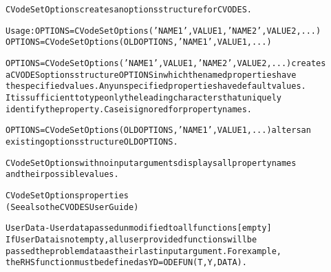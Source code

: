 \begin{alltt}
CVodeSetOptions creates an options structure for CVODES.

   Usage: OPTIONS = CVodeSetOptions('NAME1',VALUE1,'NAME2',VALUE2,...)
          OPTIONS = CVodeSetOptions(OLDOPTIONS,'NAME1',VALUE1,...)

   OPTIONS = CVodeSetOptions('NAME1',VALUE1,'NAME2',VALUE2,...) creates 
   a CVODES options structure OPTIONS in which the named properties have 
   the specified values. Any unspecified properties have default values. 
   It is sufficient to type only the leading characters that uniquely 
   identify the property. Case is ignored for property names. 
   
   OPTIONS = CVodeSetOptions(OLDOPTIONS,'NAME1',VALUE1,...) alters an 
   existing options structure OLDOPTIONS.
   
   CVodeSetOptions with no input arguments displays all property names 
   and their possible values.
   
CVodeSetOptions properties
(See also the CVODES User Guide)

UserData - User data passed unmodified to all functions [ empty ]
   If UserData is not empty, all user provided functions will be
   passed the problem data as their last input argument. For example,
   the RHS function must be defined as YD = ODEFUN(T,Y,DATA).


\end{alltt}
